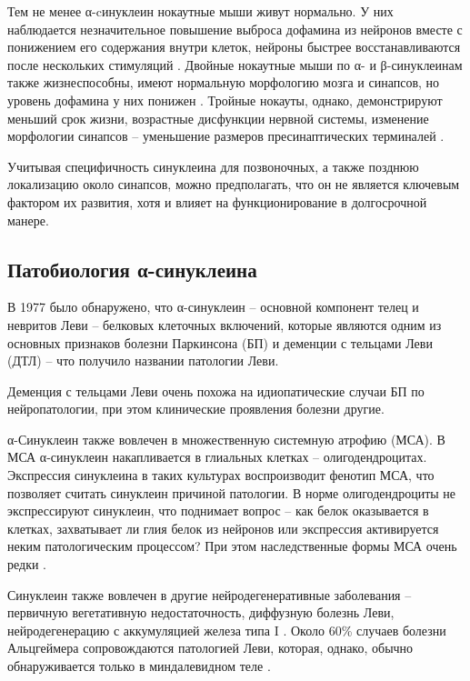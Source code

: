 Тем не менее α-cинуклеин нокаутные мыши живут нормально. У них наблюдается незначительное повышение выброса дофамина из нейронов вместе с понижением его содержания внутри клеток, нейроны быстрее восстанавливаются после нескольких стимуляций  \cite{abeliovich_mice_2000}. Двойные нокаутные мыши по α- и  β-синуклеинам также жизнеспособны, имеют нормальную морфологию мозга и синапсов, но уровень дофамина у них понижен \cite{chandra_double-knockout_2004}. Тройные нокауты, однако, демонстрируют меньший срок жизни, возрастные дисфункции нервной системы, изменение морфологии синапсов -- уменьшение размеров пресинаптических терминалей \cite{greten-harrison_-synuclein_2010}.

Учитывая специфичность синуклеина для позвоночных, а также позднюю локализацию около синапсов, можно предполагать, что он не является ключевым фактором их развития, хотя и влияет на функционирование в долгосрочной манере. 



\subsection{Патобиология α-синуклеина}

В 1977 было обнаружено, что α-синуклеин -- основной компонент телец и невритов Леви \cite{spillantini_-synuclein_1997} -- белковых клеточных включений, которые являются одним из основных признаков болезни Паркинсона (БП) и деменции с тельцами Леви (ДТЛ) -- что получило названии патологии Леви. 

Деменция с тельцами Леви очень похожа на идиопатические случаи БП по нейропатологии, при этом клинические проявления болезни другие. %

α-Синуклеин также вовлечен в множественную системную атрофию (МСА).
В МСА α-синуклеин накапливается в глиальных клетках -- олигодендроцитах. Экспрессия синуклеина в таких культурах воспроизводит фенотип МСА, что позволяет считать синуклеин причиной патологии. В норме олигодендроциты не экспрессируют синуклеин, что поднимает вопрос -- как белок оказывается в клетках, захватывает ли глия белок из нейронов или экспрессия активируется неким патологическим процессом? При этом наследственные формы МСА очень редки \cite{bendor_function_2013}.

Синуклеин также вовлечен в другие нейродегенеративные заболевания -- первичную вегетативную недостаточность, диффузную болезнь Леви, нейродегенерацию с аккумуляцией железа типа I \cite{burre_cell_2018}. Около 60\% случаев болезни Альцгеймера сопровождаются патологией Леви, которая, однако, обычно обнаруживается только в миндалевидном теле \cite{hamilton_lewy_2006}.

